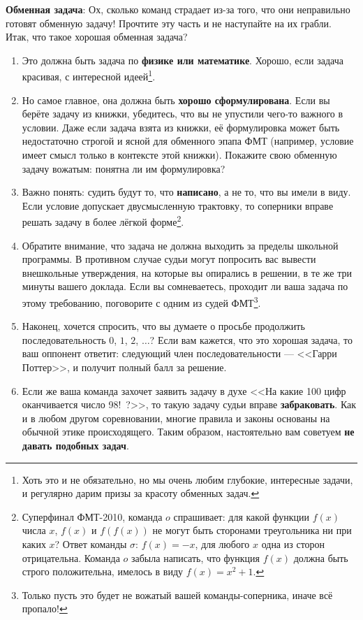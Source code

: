 \documentclass[12pt]{article}
\begin{document}
{\bf Обменная задача}: Ох, сколько команд страдает из-за того, что они неправильно готовят обменную задачу! Прочтите эту часть и не наступайте на их грабли. Итак, что такое хорошая обменная задача? 
\begin{enumerate}
\item Это должна быть задача по {\bf физике или математике}. Хорошо, если задача красивая, с интересной идеей\footnote{Хоть это и не обязательно, но мы очень любим глубокие, интересные задачи, и регулярно дарим призы за красоту обменных задач.}. 

\item Но самое главное, она должна быть {\bf хорошо сформулирована}. Если вы берёте задачу из книжки, убедитесь, что вы не упустили чего-то важного в условии. Даже если задача взята из книжки, её формулировка может быть недостаточно строгой и ясной для обменного эпапа ФМТ (например, условие имеет смысл только в контексте этой книжки). Покажите свою обменную задачу вожатым: понятна ли им формулировка? 

\item Важно понять: судить будут то, что {\bf написано}, а не то, что вы имели в виду. Если условие допускает двусмысленную трактовку, то соперники вправе решать задачу в более лёгкой форме\footnote{Суперфинал ФМТ-2010, команда $o$ спрашивает: для какой функции $f(x)$ числа $x$, $f(x)$ и $f(f(x))$ не могут быть сторонами треугольника ни при каких $x$? Ответ команды $\sigma$: $f(x) = -x$, для любого $x$ одна из сторон отрицательна. Команда $o$ забыла написать, что функция $f(x)$ должна быть строго положительна, имелось в виду $f(x) = x^2 + 1$.}. 

\item Обратите внимание, что задача не должна выходить за пределы школьной программы. В противном случае судьи могут попросить вас вывести внешкольные утверждения, на которые вы опирались в решении, в те же три минуты вашего доклада. Если вы сомневаетесь, проходит ли ваша задача по этому требованию, поговорите с одним из судей ФМТ\footnote{Только пусть это будет не вожатый вашей команды-соперника, иначе всё пропало!}.

\item Наконец, хочется спросить, что вы думаете о просьбе продолжить последовательность $0$, $1$, $2$, $\ldots$? Если вам кажется, что это хорошая задача, то ваш оппонент ответит: следующий член последовательности --- <<Гарри Поттер>>, и получит полный балл за решение.

\item Если же ваша команда захочет заявить задачу в духе <<На какие 100 цифр оканчивается число 98!~?>>, то такую задачу судьи вправе \textbf{забраковать}. Как и в любом другом соревновании, многие правила и законы основаны на обычной этике происходящего. Таким образом, настоятельно вам советуем  {\bf не давать подобных задач}.


\end{enumerate}
\end{document}
